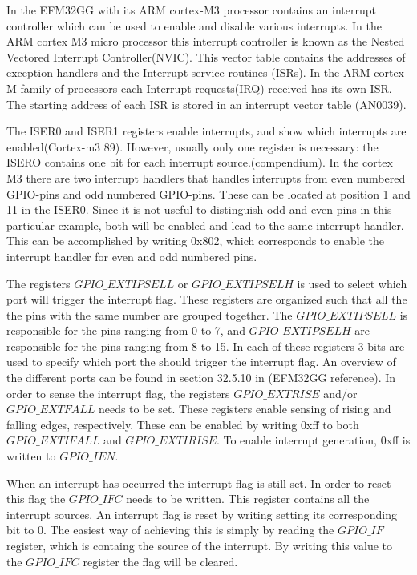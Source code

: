 In the EFM32GG with its ARM cortex-M3 processor contains an interrupt controller which can be used to enable and disable various interrupts. In the ARM cortex M3 micro processor this interrupt controller is known as the Nested Vectored Interrupt Controller(NVIC). This vector table contains the addresses of exception handlers and the Interrupt service routines (ISRs). In the ARM cortex M family of processors each Interrupt requests(IRQ) received has its own ISR. The starting address of each ISR is stored in an interrupt vector table (AN0039). 

The ISER0 and ISER1 registers enable interrupts, and show which interrupts are enabled(Cortex-m3 89). However, usually only one register is necessary: the ISERO contains one bit for each interrupt source.(compendium). In the cortex M3 there are two interrupt handlers that handles interrupts from even numbered GPIO-pins and odd numbered GPIO-pins. These can be located at position 1 and 11 in the ISER0. Since it is not useful to distinguish odd and even pins in this particular example, both will be enabled and lead to the same interrupt handler. This can be accomplished by writing 0x802, which corresponds to enable the interrupt handler for even and odd numbered pins.

The registers $GPIO\_EXTIPSELL$ or $GPIO\_EXTIPSELH$ is used to select which port will trigger the interrupt flag. These registers are organized such that all the the pins with the same number are grouped together. The $GPIO\_EXTIPSELL$ is responsible for the pins ranging from 0 to 7, and $GPIO\_EXTIPSELH$ are responsible for the pins ranging from 8 to 15. In each of these registers 3-bits are used to specify which port the should trigger the interrupt flag. An overview of the different ports can be found in section 32.5.10 in (EFM32GG reference). In order to sense the interrupt flag, the registers $GPIO\_EXTRISE$ and/or $GPIO\_EXTFALL$ needs to be set. These registers enable sensing of rising and falling edges, respectively. These can be enabled by writing 0xff to both $GPIO\_EXTIFALL$ and $GPIO\_EXTIRISE$.  To enable interrupt generation, 0xff is written to $GPIO\_IEN$. 


When an interrupt has occurred the interrupt flag is still set. In order to reset this flag the $GPIO\_IFC$ needs to be written. This register contains all the interrupt sources. An interrupt flag is reset by writing setting its corresponding bit to 0. The easiest way of achieving this is simply by reading the $GPIO\_IF$ register, which is containg the source of the interrupt. By writing this value to the $GPIO\_IFC$ register the flag will be cleared.  



